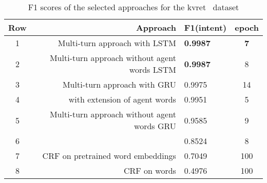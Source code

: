 
\begin{table}
  \begin{tabularx}{\textwidth}{crlc}
    \toprule
    Row & Approach & F1(intent) & epoch\\
    \midrule
    1 & Multi-turn approach with LSTM & \textbf{0.9987} & \textbf{7} \\ %
    2 & Multi-turn approach without agent words LSTM & \textbf{0.9987} & 8 \\ %
    3 & Multi-turn approach with GRU & 0.9975 & 14 \\ %
    4 & \cite{liu2016attention} with extension of agent words & 0.9951 & 5 \\ %
    5 & Multi-turn approach without agent words GRU & 0.9585 & 9 \\ %
    6 & \cite{liu2016attention} & 0.8524 & 8\\ %
    \midrule
    7 & CRF on pretrained word embeddings & 0.7049 & 100 \\ %
    8 & CRF on words & 0.4976 & 100 \\ %
    \bottomrule
  \end{tabularx}
  \caption{F1 scores of the selected approaches for the kvret~\cite{eric2017key} dataset}\label{tab:multiTurnScores}
\end{table}